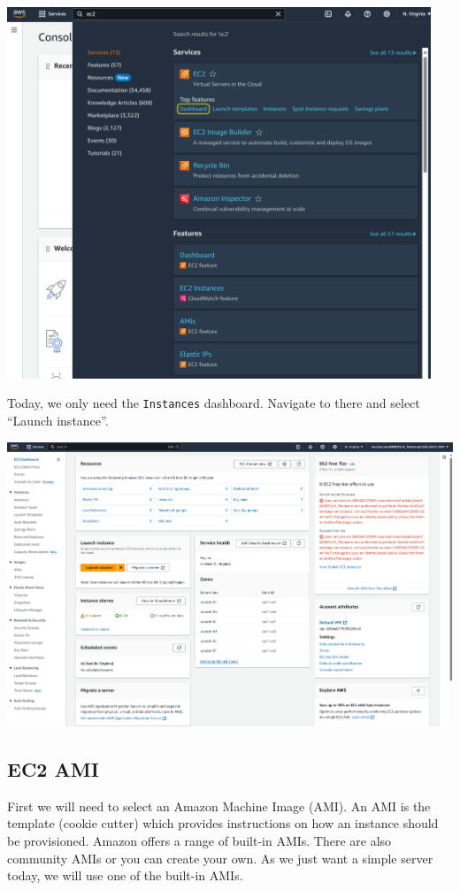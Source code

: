 \documentclass{csse4400}
\begin{document}

\vspace{2mm}
\includegraphics[trim=0 200 0 0,clip,width=0.95\textwidth]{images/search-ec2}
\vspace{5mm}

\noindent
Today, we only need the \texttt{Instances} dashboard.
Navigate to there and select ``Launch instance''.

\vspace{5mm}
\noindent
\includegraphics[width=\textwidth]{images/ec2-interface}

\subsection{EC2 AMI}
First we will need to select an Amazon Machine Image (AMI).
An AMI is the template (cookie cutter) which provides instructions on how an instance should be provisioned.
Amazon offers a range of built-in AMIs. There are also community AMIs or you can create your own.
As we just want a simple server today, we will use one of the built-in AMIs.
\end{document}
